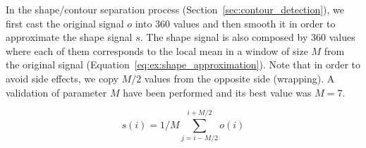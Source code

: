 In the shape/contour separation process (Section~\ref{sec:contour_detection}), we first cast the original signal $o$ into 360 values and then smooth it in order to approximate the shape signal $s$.
The shape signal is also composed by 360 values where each of them corresponds to the local mean in a window of size $M$ from the original signal (Equation~\ref{eq:ex:shape_approximation}).
Note that in order to avoid side effects, we copy $M/2$ values from the opposite side (wrapping).
A validation of parameter $M$ have been performed and its best value was $M=7$.

\begin{equation}
  \label{eq:ex:shape_approximation}
  s(i) = 1/M \sum_{j=i-M/2}^{i+M/2} o(i)
\end{equation}





